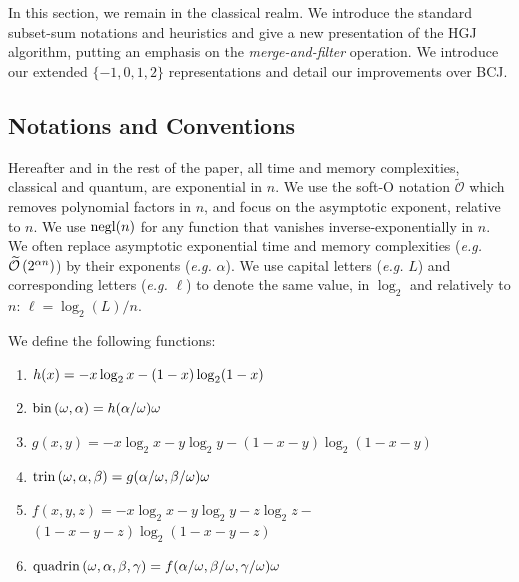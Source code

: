 
In this section, we remain in the classical realm. We introduce the standard subset-sum notations and heuristics and give a new presentation of the HGJ algorithm, putting an emphasis on the \emph{merge-and-filter} operation. We introduce our extended $\{-1,0,1,2\}$ representations and detail our improvements over BCJ.


\subsection{Notations and Conventions}


Hereafter and in the rest of the paper, all time and memory complexities, classical and quantum, are exponential in $n$. We use the soft-O notation $\widetilde{\mathcal{O}}$ which removes polynomial factors in $n$, and focus on the asymptotic exponent, relative to $n$. We use $\operatorname{negl}(n)$ for any function that vanishes inverse-exponentially in $n$. We often replace asymptotic exponential time and memory complexities (\emph{e.g.} $\widetilde{\mathcal{O}} \left(2^{\alpha n} \right)$) by their exponents (\emph{e.g.} $\alpha$). We use capital letters (\emph{e.g.} $L$) and corresponding letters (\emph{e.g.} $\ell$) to denote the same value, in $\log_2$ and relatively to $n$: $\ell = \log_2(L) / n$. %

\begin{definition}
We define the following functions:
 \begin{enumerate}[topsep=0pt,leftmargin=3.6cm]
  \item[\bf Hamming Entropy:]$h(x) = - x \log_2 x - (1-x) \log_2 (1-x)$
  \item[\bf Binomial:]$\mathrm{bin}\left(\omega,\alpha\right)  = h(\alpha / \omega) \omega$
  \item[\bf 2-way Entropy:]$g(x,y) = -x \log_2 x - y \log_2 y - (1-x-y) \log_2 (1-x-y)$
  \item[\bf Trinomial:]$\mathrm{trin}\left(\omega,\alpha,\beta\right) = g(\alpha / \omega, \beta / \omega) \omega$
  \item[\bf 3-way Entropy:]$f(x, y, z) =  - x \log_2 x - y \log_2 y - z \log_2 z -$\\
  \phantom{a} \hfill $(1-x-y-z) \log_2 (1-x-y-z)$
  \item[\bf Quadrinomial:] $\mathrm{quadrin}\left(\omega,\alpha,\beta,\gamma\right) = f(\alpha/\omega, \beta/\omega, \gamma/\omega)\omega$
 \end{enumerate}
\end{definition}


